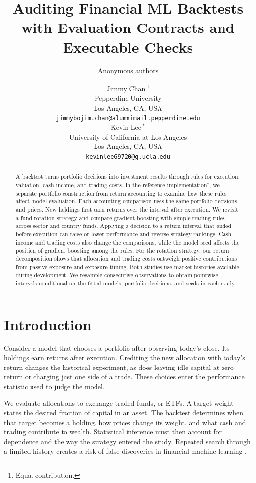 \documentclass{article}
\title{Auditing Financial ML Backtests with Evaluation Contracts and Executable Checks}
\author{Anonymous authors}
\author{%
  Jimmy Chan\,{\hypersetup{pdfborder={0 0 0}}\orcidlink{0009-0002-4670-2828}}\thanks{Equal contribution.} \\
  Pepperdine University \\
  Los Angeles, CA, USA \\
  \texttt{jimmybojim.chan@alumnimail.pepperdine.edu} \\
  \And
  Kevin Lee\,{\hypersetup{pdfborder={0 0 0}}\orcidlink{0009-0004-0388-9260}}$^{*}$ \\
  University of California at Los Angeles \\
  Los Angeles, CA, USA \\
  \texttt{kevinlee69720@g.ucla.edu}
}
\newif\ifquantcortexreview
\newcommand{\system}{the reference implementation}
\newcommand{\system}{QuantCortex}
\begin{document}
\maketitle
\ifquantcortexreview\else
  \begingroup
    \renewcommand{\thefootnote}{\fnsymbol{footnote}}%
  \endgroup
\fi

\begin{abstract}
A backtest turns portfolio decisions into investment results through rules for execution, valuation, cash income, and trading costs. In \system{}\ifquantcortexreview\else{$^{\dagger}$}\fi{}, we separate portfolio construction from return accounting to examine how these rules affect model evaluation. Each accounting comparison uses the same portfolio decisions and prices. New holdings first earn returns over the interval after execution. We revisit a fund rotation strategy and compare gradient boosting with simple trading rules across sector and country funds. Applying a decision to a return interval that ended before execution can raise or lower performance and reverse strategy rankings. Cash income and trading costs also change the comparisons, while the model seed affects the position of gradient boosting among the rules. For the rotation strategy, our return decomposition shows that allocation and trading costs outweigh positive contributions from passive exposure and exposure timing. Both studies use market histories available during development. We resample consecutive observations to obtain pointwise intervals conditional on the fitted models, portfolio decisions, and seeds in each study.
\end{abstract}

\section{Introduction}

Consider a model that chooses a portfolio after observing today's close. Its holdings earn returns after execution. Crediting the new allocation with today's return changes the historical experiment, as does leaving idle capital at zero return or charging just one side of a trade. These choices enter the performance statistic used to judge the model.

We evaluate allocations to exchange-traded funds, or ETFs. A target weight states the desired fraction of capital in an asset. The backtest determines when that target becomes a holding, how prices change its weight, and what cash and trading contribute to wealth. Statistical inference must then account for dependence and the way the strategy entered the study. Repeated search through a limited history creates a risk of false discoveries in financial machine learning
\citep{white2000reality,harvey2016crosssection,bailey2014deflated,
bailey2017pbo,arnott2019protocol}.
\end{document}
